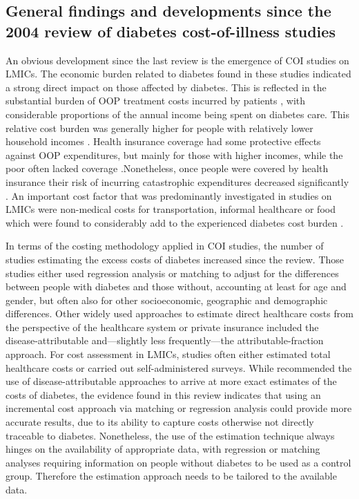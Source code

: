 \subsection{General findings and developments since the 2004 review of diabetes cost-of-illness studies}
An obvious development since the last review is the emergence of \ac{COI} studies on \acp{LMIC}. The economic burden related to diabetes found in these studies indicated a strong direct impact on those affected by diabetes. This is reflected in the substantial burden of \ac{OOP} treatment costs incurred by patients \parencite{Smith-Spangler2012,Suleiman2006,Arredondo2007,Esteghamati2009,Wang2009b,Ramachandran2007d,Khowaja2007a,Elrayah-Eliadarous2010b,Chatterjee2011c,Tharkar2010a,Wang2010c}, with considerable proportions of the annual income being spent on diabetes care. This relative cost burden was generally higher for people with relatively lower household incomes \parencite{Ramachandran2007d,Khowaja2007a,Tharkar2010a}. Health insurance coverage had some protective effects against \ac{OOP} expenditures, but mainly for those with higher incomes, while the poor often lacked coverage \parencite{Ramachandran2007d,Khowaja2007a,Tharkar2010a}.Nonetheless, once people were covered by health insurance their risk of incurring catastrophic expenditures decreased significantly \parencite{Smith-Spangler2012}. An important cost factor that was predominantly investigated in studies on \acp{LMIC} were non-medical costs for transportation, informal healthcare or food which were found to considerably add to the experienced diabetes cost burden \parencite{Esteghamati2009,Wang2009b,Wang2009f,Chatterjee2011c,Tharkar2010a}.

In terms of the costing methodology applied in \ac{COI} studies, the number of studies estimating the excess costs of diabetes increased since the \textcite{Ettaro2004} review. Those studies either used regression analysis or matching to adjust for the differences between people with diabetes and those without, accounting at least for age and gender, but often also for other socioeconomic, geographic and demographic differences. Other widely used approaches to estimate direct healthcare costs from the perspective of the healthcare system or private insurance included the disease-attributable and---slightly less frequently---the attributable-fraction approach. For cost assessment in \acp{LMIC}, studies often either estimated total healthcare costs or carried out self-administered surveys. While \textcite{Ettaro2004} recommended the use of disease-attributable approaches to arrive at more exact estimates of the costs of diabetes, the evidence found in this review indicates that using an incremental cost approach via matching or regression analysis could provide more accurate results, due to its ability to capture costs otherwise not directly traceable to diabetes. Nonetheless, the use of the estimation technique always hinges on the availability of appropriate data, with regression or matching analyses requiring information on people without diabetes to be used as a control group. Therefore the estimation approach needs to be tailored to the available data. 

